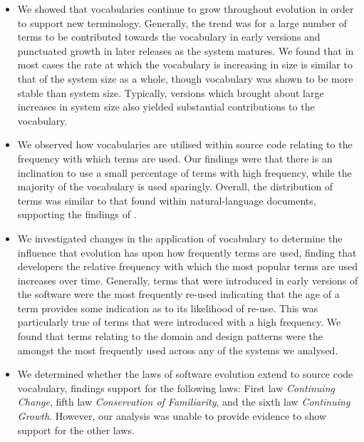\begin{itemize}
	
	\item We showed that vocabularies continue to grow throughout evolution in order to support new terminology. Generally, the trend was for a large number of terms to be contributed towards the vocabulary in early versions and punctuated growth in later releases as the system matures. We found that in most cases the rate at which the vocabulary is increasing in size is similar to that of the system size as a whole, though vocabulary was shown to be more stable than system size. Typically, versions which brought about large increases in system size also yielded substantial contributions to the vocabulary.

	\item We observed how vocabularies are utilised within source code relating to the frequency with which terms are used. Our findings were that there is an inclination to use a small percentage of terms with high frequency, while the majority of the vocabulary is used sparingly. Overall, the distribution of terms was similar to that found within natural-language documents, supporting the findings of \cite{Pierret09a}.

\item We investigated changes in the application of vocabulary to determine the influence that evolution has upon how frequently terms are used, finding that developers the relative frequency with which the most popular terms are used increases over time. Generally, terms that were introduced in early versions of the software were the most frequently re-used indicating that the age of a term provides some indication as to its likelihood of re-use. This was particularly true of terms that were introduced with a high frequency. We found that terms relating to the domain and design patterns were the amongst the most frequently used across any of the systems we analysed.
	
	\item We determined whether the laws of software evolution \cite{Lehman97a} extend to source code vocabulary, findings support for the following laws: First law \emph{Continuing Change}, fifth law \emph{Conservation of Familiarity}, and the sixth law \emph{Continuing Growth}. However, our analysis was unable to provide evidence to show support for the other laws.

\end{itemize}


